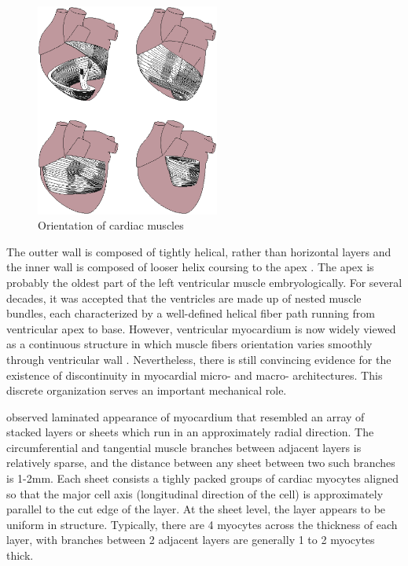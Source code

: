 \begin{figure}[hbt]
  \centerline{\includegraphics[height=7cm,
    angle=0]{./images/fiber_anatomy.eps}}
  \caption{Orientation of cardiac muscles}
  \label{fig:fiber_anatomy}
\end{figure}

The outter wall is composed of tightly helical, rather than horizontal layers
and the inner wall is composed of looser helix coursing to the apex
\citep{Grant1965}. The apex is probably the oldest part of the left ventricular
muscle embryologically.
For several decades, it was accepted that the ventricles are made up of nested
muscle bundles, each characterized by a well-defined helical fiber path running
from ventricular apex to base. However, ventricular myocardium is now widely
viewed as a continuous structure in which muscle fibers orientation varies
smoothly through ventricular wall \citep{LeGrice1995}. Nevertheless, there is
still convincing evidence for the existence  of discontinuity in myocardial
micro- and macro- architectures. This discrete organization serves an important
mechanical role.

\citep{LeGrice1995} observed laminated appearance of myocardium that resembled
an array of stacked layers or sheets which run in an approximately radial
direction. The circumferential and tangential muscle branches between adjacent
layers is relatively sparse, and the distance between any sheet between two such
branches is 1-2mm. Each sheet consists a tighly packed groups of cardiac
myocytes aligned so that the major cell axis (longitudinal direction of the
cell) is approximately parallel to the cut edge of the layer. At the sheet
level, the layer appears to be uniform in structure. Typically, there are 4
myocytes across the thickness of each layer, with branches between 2 adjacent
layers are generally 1 to 2 myocytes thick.
 
